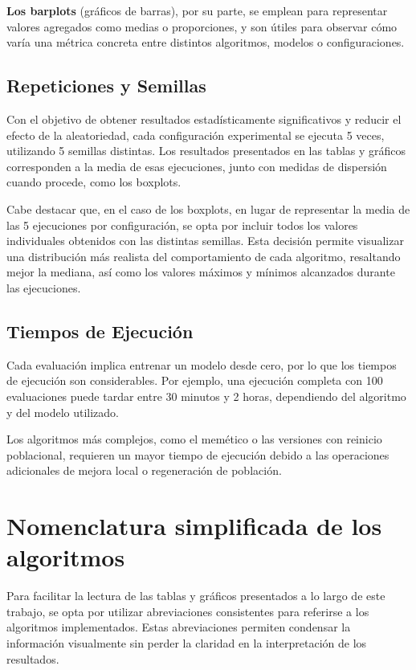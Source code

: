 \textbf{Los barplots} (gráficos de barras), por su parte, se emplean para representar valores agregados como medias o proporciones,
y son útiles para observar cómo varía una métrica concreta entre distintos algoritmos, modelos o configuraciones.

\subsection{Repeticiones y Semillas}\label{sec:repeticiones-y-semillas}
Con el objetivo de obtener resultados estadísticamente significativos y reducir el efecto de la aleatoriedad,
cada configuración experimental se ejecuta 5 veces, utilizando 5 semillas distintas.
Los resultados presentados en las tablas y gráficos corresponden a la media de esas ejecuciones,
junto con medidas de dispersión cuando procede, como los boxplots.

Cabe destacar que, en el caso de los boxplots, en lugar de representar la media de las 5 ejecuciones por configuración,
se opta por incluir todos los valores individuales obtenidos con las distintas semillas.
Esta decisión permite visualizar una distribución más realista del comportamiento de cada algoritmo,
resaltando mejor la mediana, así como los valores máximos y mínimos alcanzados durante las ejecuciones.

\subsection{Tiempos de Ejecución}\label{sec:tiempos-de-ejecucion}
Cada evaluación implica entrenar un modelo desde cero, por lo que los tiempos de ejecución son considerables.
Por ejemplo, una ejecución completa con 100 evaluaciones puede tardar entre 30 minutos y 2 horas,
dependiendo del algoritmo y del modelo utilizado.

Los algoritmos más complejos, como el memético o las versiones con reinicio poblacional,
requieren un mayor tiempo de ejecución debido a las operaciones adicionales de mejora local o regeneración de población.


\section{Nomenclatura simplificada de los algoritmos}
Para facilitar la lectura de las tablas y gráficos presentados a lo largo de este trabajo,
se opta por utilizar abreviaciones consistentes para referirse a los algoritmos implementados.
Estas abreviaciones permiten condensar la información visualmente sin perder la claridad en la interpretación de los resultados.

